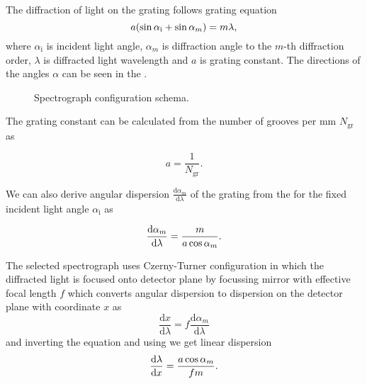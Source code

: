 The diffraction of light on the grating follows grating equation
\begin{equation}
	a(\sin\alpha_\text{i} + \sin\alpha_m) = m\lambda,
	\label{\eqnlabel{spectrograph_selection:grating_equation}}
\end{equation}
where $\alpha_\text{i}$ is incident light angle, $\alpha_m$ is diffraction
angle to the $m$-th diffraction order, $\lambda$ is diffracted light wavelength
and $a$ is grating constant. The directions of the angles $\alpha$ can be seen
in the
.

\begin{figure}
	\centering
	
	\caption{Spectrograph configuration schema.}
	\label{\figlabel{spectrograph_selection:configuration_schema}}
\end{figure}

The grating constant can be calculated from the number of grooves per mm
$N_\text{gr}$ as

\begin{equation*}
	a = \frac{1}{N_\text{gr}}.
\end{equation*}

We can also derive angular dispersion
$\frac{\text{d}\alpha_m}{\text{d}\lambda}$
of the grating from the
for the fixed incident light angle $\alpha_\text{i}$ as

\begin{equation}
	\frac{\text{d}\alpha_m}{\text{d}\lambda} = \frac{m}{a\cos\alpha_m}.
	\label{\eqnlabel{spectrograph_selection:angular_dispersion}}
\end{equation}

The selected spectrograph uses Czerny-Turner configuration in which the
diffracted light is focused onto detector plane by focussing mirror with
effective focal length $f$ which converts angular dispersion to dispersion on
the detector plane with coordinate $x$ as
\begin{equation*}
	\frac{\text{d}x}{\text{d}\lambda} =
		f\frac{\text{d}\alpha_m}{\text{d}\lambda}
\end{equation*}
and inverting the equation and using
we get linear dispersion
\begin{equation}
	\frac{\text{d}\lambda}{\text{d}x} = \frac{a\cos\alpha_m}{fm}.
	\label{\eqnlabel{spectrograph_selection:linear_dispersion}}
\end{equation}

